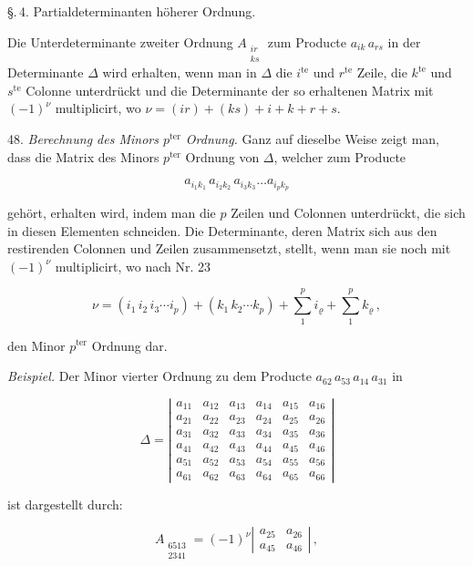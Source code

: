 \S.\,4. Partialdeterminanten h\"oherer Ordnung.

\glqq Die Unterdeterminante zweiter Ordnung $A_{\substack{ir\\ks}}$ zum Producte $a_{ik}\,a_{rs}$
in der Determinante $\varDelta$ wird erhalten, wenn man in $\varDelta$ die $i^{\text{te}}$ und
$r^{\text{te}}$ Zeile, die $k^{\text{te}}$ und $s^{\text{te}}$ Colonne unterdr\"uckt und die
Determinante der so erhaltenen Matrix mit $(-1)^\nu$ multiplicirt, wo $\nu=(ir)+(ks)+i+k+r+s$.\grqq{}

48. \textit{Berechnung des Minors $p^{\text{ter}}$ Ordnung.} Ganz auf dieselbe Weise zeigt man,
dass die Matrix des Minors $p^{\text{ter}}$ Ordnung von $\varDelta$, welcher zum Producte

\[
a_{i_1 k_1}\, a_{i_2 k_2}\, a_{i_3 k_3} \dots a_{i_p k_p}
\]

geh\"ort, erhalten wird, indem man die $p$ Zeilen und Colonnen unterdr\"uckt, die sich in diesen
Elementen schneiden. Die Determinante, deren Matrix sich aus den restirenden Colonnen und Zeilen
zusammensetzt, stellt, wenn man sie noch mit $(-1)^\nu$ multiplicirt, wo nach Nr. 23

\[
\nu = (i_1\,i_2\,i_3 \cdots i_p) + (k_1\,k_2 \cdots k_p) + \sum_1^p i_\varrho + \sum_1^p k_\varrho \,,
\]

den Minor $p^{\text{ter}}$ Ordnung dar.

\textit{Beispiel.} Der Minor vierter Ordnung zu dem Producte $a_{62}\,a_{53}\,a_{14}\,a_{31}$ in

\[
\varDelta = \left|
\begin{array}{cccccc}
a_{11} & a_{12} & a_{13} & a_{14} & a_{15} & a_{16} \\
a_{21} & a_{22} & a_{23} & a_{24} & a_{25} & a_{26} \\
a_{31} & a_{32} & a_{33} & a_{34} & a_{35} & a_{36} \\
a_{41} & a_{42} & a_{43} & a_{44} & a_{45} & a_{46} \\
a_{51} & a_{52} & a_{53} & a_{54} & a_{55} & a_{56} \\
a_{61} & a_{62} & a_{63} & a_{64} & a_{65} & a_{66}
\end{array}
\right|
\]

ist dargestellt durch:

\[
A_{\substack{6513\\2341}} = (-1)^\nu \left| \begin{array}{cc} a_{25} & a_{26} \\ a_{45} & a_{46} \end{array} \right|\,,
\]

